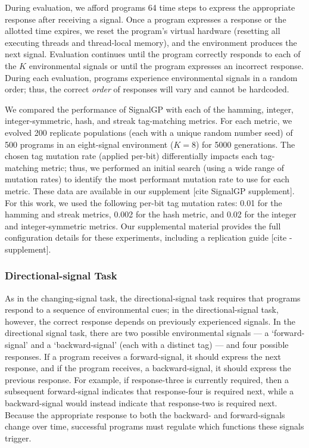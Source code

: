 During evaluation, we afford programs 64 time steps to express the appropriate response after receiving a signal.
Once a program expresses a response or the allotted time expires, we reset the program's virtual hardware (resetting all executing threads and thread-local memory), and the environment produces the next signal.
Evaluation continues until the program correctly responds to each of the $K$ environmental signals or until the program expresses an incorrect response.
During each evaluation, programs experience environmental signals in a random order; thus, the correct \textit{order} of responses will vary and cannot be hardcoded.

We compared the performance of SignalGP with each of the hamming, integer, integer-symmetric, hash, and streak tag-matching metrics.
For each metric, we evolved 200 replicate populations (each with a unique random number seed) of 500 programs in an eight-signal environment ($K=8$) for 5000 generations.
The chosen tag mutation rate (applied per-bit) differentially impacts each tag-matching metric; thus, we performed an initial search (using a wide range of mutation rates) to identify the most performant mutation rate to use for each metric.
These data are available in our supplement [cite SignalGP supplement].
For this work, we used the following per-bit tag mutation rates: 0.01 for the hamming and streak metrics, 0.002 for the hash metric, and 0.02 for the integer and integer-symmetric metrics.
Our supplemental material provides the full configuration details for these experiments, including a replication guide [cite - supplement].

\subsubsection{Directional-signal Task}

As in the changing-signal task, the directional-signal task requires that programs respond to a sequence of environmental cues; in the directional-signal task, however, the correct response depends on previously experienced signals.
In the directional signal task, there are two possible environmental signals --- a `forward-signal' and a `backward-signal' (each with a distinct tag) ---  and four possible responses.
If a program receives a forward-signal, it should express the next response, and if the program receives, a backward-signal, it should express the previous response.
For example, if response-three is currently required, then a subsequent forward-signal indicates that response-four is required next, while a backward-signal would instead indicate that response-two is required next.
Because the appropriate response to both the backward- and forward-signals change over time, successful programs must regulate which functions these signals trigger.

